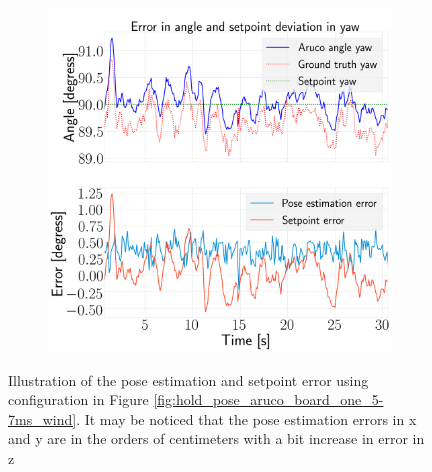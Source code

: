 \documentclass[../Head/report.tex]{subfiles}
\begin{document}
\begin{figure}[H]
\begin{subfigure}[t]{.30\textwidth}
        \caption{}
        \label{fig:optitrack_hold_pose_using_estimated_aruco_pose_error_pitch_test_five}
    \end{subfigure}
     \hspace{0.2em}
    \begin{subfigure}[t]{.30\textwidth}
        \centering
        \includegraphics[width=\textwidth]{../Figures/optitrack/hold_pose_using_estimated_aruco_pose/pose_error_yaw_test5.png}
        \caption{}
        \label{fig:optitrack_hold_pose_using_estimated_aruco_pose_error_yaw_test_five}
    \end{subfigure}
    \caption{Illustration of the pose estimation and setpoint error using configuration in Figure \ref{fig:hold_pose_aruco_board_one_5-7ms_wind}. It may be noticed that the pose estimation errors in x and y are in the orders of centimeters with a bit increase in error in z}
    \label{fig:optitrack_hold_pose_using_estimated_aruco_pose_error_ori_test_five}
\end{figure}
\end{document}
